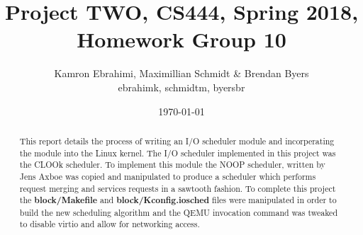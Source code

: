 \documentclass[10pt,onecolumn,draftclsnofoot]{IEEEtran} %
\title{ Project TWO, CS444, Spring 2018, Homework Group 10}
\author{Kamron Ebrahimi, Maximillian Schmidt \& Brendan Byers \\ ebrahimk, schmidtm, byersbr }
\date{\today}
\begin{document}
\begin{titlingpage}
\maketitle
\begin{abstract}
\begin{singlespace}
This report details the process of writing an I/O scheduler module and incorperating the module into the Linux kernel. The I/O scheduler implemented in this project was the CLOOk scheduler. To implement this module the NOOP scheduler, written by Jens Axboe was copied and manipulated to produce a scheduler which performs request merging and services requests in a sawtooth fashion. To complete this project the \textbf{block/Makefile} and \textbf{block/Kconfig.iosched} files were manipulated in order to build the new scheduling algorithm and the QEMU invocation command was tweaked to disable virtio and allow for networking access.
\end{singlespace}
\end{abstract}
\end{titlingpage}


\tableofcontents
\end{document}
